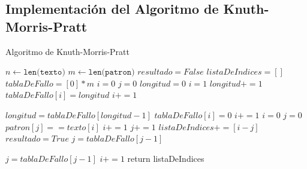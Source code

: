 \subsection*{Implementación del Algoritmo de Knuth-Morris-Pratt}
\begin{algorithm} [H]
    \caption{Algoritmo de Knuth-Morris-Pratt}\label{alg:KMP}
    \begin{algorithmic} [1]
            \State $n \gets \texttt{len(texto)}$
            \State $m \gets \texttt{len(patron)}$
            \State $resultado = False$
            \State $listaDeIndices = []$
            \State $tablaDeFallo = [0]*m$ 
            \State $i = 0$
            \State $j = 0$
                \State $longitud = 0$ 
                \State $i = 1$
                        \State $longitud += 1$
                        \State $tablaDeFallo[i] = longitud$
                        \State $i += 1$
                    
                    \Else 
                            \State $longitud = tablaDeFallo[longitud-1]$
                        \Else
                            \State $tablaDeFallo[i] = 0$
                            \State $i += 1$
                        \EndIf
                    \EndIf
                \EndWhile
            \EndProcedure
                \State $i = 0$
                \State $j = 0$
                    \If $patron[j] == texto[i]$
                        \State $i += 1$
                        \State $j += 1$
                        \EndIf
        \State $listaDeIndices += [i-j]$
        \State $resultado = True$
        \State $j = tablaDeFallo[j-1]$
    \end{algorithmic}
\end{algorithm}

\begin{algorithm} [H]
    \begin{algorithmic} [1]
            \State $j = tablaDeFallo[j-1]$
        \Else 
            \State $i += 1$
        \EndIf
    \EndIf
    \EndWhile
    \EndProcedure
    \State return listaDeIndices
    \EndProcedure
        
    \end{algorithmic}
\end{algorithm}




